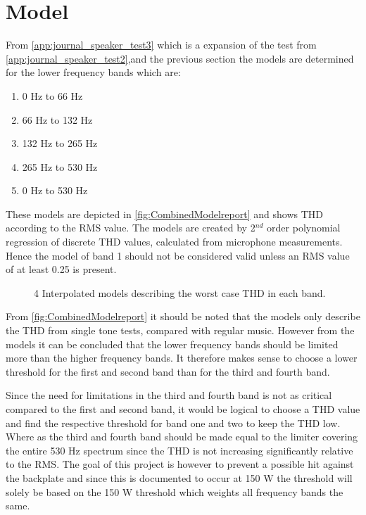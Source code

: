 \section{Model}
From \autoref{app:journal_speaker_test3} which is a expansion of the test from \autoref{app:journal_speaker_test2},and the previous section the models are determined for the lower frequency bands which are:
\begin{enumerate}
\item 0 Hz to 66 Hz
\item 66 Hz to 132 Hz
\item 132 Hz to 265 Hz
\item 265 Hz to 530 Hz
\item 0 Hz to 530 Hz
\end{enumerate}
These models are depicted in \autoref{fig:CombinedModelreport} and shows THD according to the RMS value. The models are created by 2$^{nd}$ order polynomial regression of discrete THD values, calculated from microphone measurements. Hence the model of band 1 should not be considered valid unless an RMS value of at least 0.25 is present.

\begin{figure}[H]
    \centering
    
    \caption{4 Interpolated models describing the worst case THD in each band.}
    \label{fig:CombinedModelreport}
\end{figure}

From \autoref{fig:CombinedModelreport} it should be noted that the models only describe the THD from single tone tests, compared with regular music. However from the models it can be concluded that the lower frequency bands should be limited more than the higher frequency bands. It therefore makes sense to choose a lower threshold for the first and second band than for the third and fourth band. 

\vspace{2mm}
Since the need for limitations in the third and fourth band is not as critical compared to the first and second band, it would be logical to choose a THD value and find the respective threshold for band one and two to keep the THD low. Where as the third and fourth band should be made equal to the limiter covering the entire 530 Hz spectrum since the THD is not increasing significantly relative to the RMS. The goal of this project is however to prevent a possible hit against the backplate and since this is documented to occur at 150 W the threshold will solely be based on the 150 W threshold which weights all frequency bands the same. 